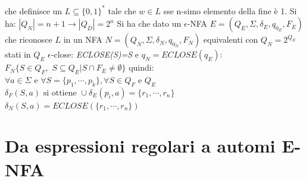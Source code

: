 che definisce un $L\subseteq\{0,1\}^*$ tale che $w\in L$ sse n-simo elemento della fine è 1. Si ha:
$|Q_N|=n+1\to |Q_D|=2^n$
Si ha che dato un $\epsilon$-NFA $E=(Q_E, \Sigma, \delta_E, q_{0_E}, F_E)$ che riconosce $L$ in un NFA $N=(Q_N, \Sigma, \delta_N, q_{0_N}, F_N)$ equivalenti con $Q_N=2^{Q_E}$ stati in $Q_E$ $\epsilon$-close: \textit{ECLOSE(S)=S} e $q_N=ECLOSE(q_E)$:
$F_N\{S\in Q_F,\,\, S\subseteq Q_E | S\cap F_E\neq \emptyset\}$
quindi:
$\forall a\in \Sigma \text{ e } \forall S=\{p_1,\cdots,p_k\}, \forall S\in Q_F \text{ e } Q_E$
$\delta_F(S,a) \text{ si ottiene }\cup \delta_E(p_i,a)=\{r_1,\cdots, r_n\}$
$\delta_N(S,a)=ECLOSE(\{r_1, \cdots, r_n\})$

\section{Da espressioni regolari a automi E-NFA}
